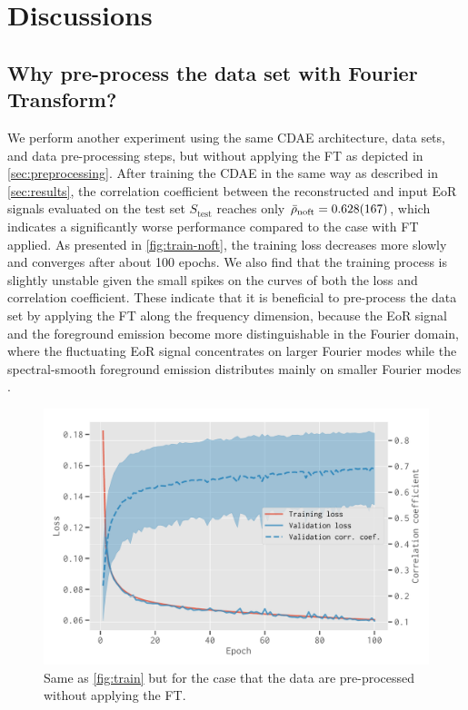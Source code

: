 \documentclass[fleqn,usenatbib]{mnras}
\newcommand{\R}[1]{\mathrm{#1}}
\begin{document}
\section{Discussions}
\label{sec:discussions}

\subsection{Why pre-process the data set with Fourier Transform?}
\label{sec:why-ft}

We perform another experiment using the same CDAE architecture,
data sets, and data pre-processing steps, but without
applying the FT as depicted in \autoref{sec:preprocessing}.
After training the CDAE in the same way as described in
\autoref{sec:results}, the correlation coefficient between the
reconstructed and input EoR signals evaluated on the test set
$S_{\R{test}}$ reaches only $\bar{\rho}_{\R{noft}} = \num{0.628 +- 0.167}$,
which indicates a significantly worse performance compared to the case with
FT applied.
As presented in \autoref{fig:train-noft}, the training loss decreases more
slowly and converges after about 100 epochs.
We also find that the training process is slightly unstable given the small
spikes on the curves of both the loss and correlation coefficient.
These indicate that it is beneficial to pre-process the
data set by applying the FT along the frequency dimension, because the
EoR signal and the foreground emission become more distinguishable
in the Fourier domain, where the fluctuating EoR signal concentrates on
larger Fourier modes while the spectral-smooth foreground emission
distributes mainly on smaller Fourier modes \citep[e.g.,][]{parsons2012}.

\begin{figure}
  \centering
  \includegraphics[width=\columnwidth]{cdae-train-noft}
  \caption{\label{fig:train-noft}%
    Same as \autoref{fig:train} but for the case that the data are
    pre-processed without applying the FT.
  }
\end{figure}
\end{document}
